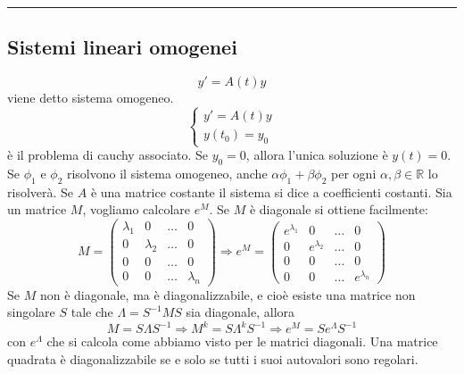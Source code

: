 \rule{\textwidth}{2pt}
\subsection*{Sistemi lineari omogenei}
\[
    y' = A(t) y
\]
viene detto sistema omogeneo.\newline
\[
    \begin{cases}
        y' = A(t) y\\
        y(t_0) = y_0
    \end{cases}
\]
è il problema di cauchy associato.\newline
\newline
Se $y_0 = 0$, allora l'unica soluzione è $y(t) = 0$.\newline
\newline
Se $\phi_1$ e $\phi_2$ risolvono il sistema omogeneo, anche $\alpha \phi_1 + \beta \phi_2$ per ogni $\alpha, \beta \in \mathbb{R}$ lo risolverà.\newline
\newline
Se $A$ è una matrice costante il sistema si dice a coefficienti costanti.\newline
\newline
Sia un matrice $M$, vogliamo calcolare $e^{M}$. \newline
Se $M$ è diagonale si ottiene facilmente:
\[
    M = \left( \begin{matrix}
        \lambda_1  & 0 &\dots & 0\\
        0 & \lambda_2 &\dots &0\\
        0 & 0 &\dots &0\\
        0 & 0 &\dots &\lambda_n
    \end{matrix} \right) \Rightarrow e^M = \left( \begin{matrix}
        e^{\lambda_1}  & 0 &\dots & 0\\
        0 & e^{\lambda_2} &\dots &0\\
        0 & 0 &\dots &0\\
        0 & 0 &\dots & e^{\lambda_n}
    \end{matrix} \right)
\]
Se $M$ non è diagonale, ma è diagonalizzabile, e cioè esiste una matrice non singolare $S$ tale che $\Lambda = S^{-1}MS$ sia diagonale, allora
\[
    M = S\Lambda S^{-1} \Rightarrow  M^k = S\Lambda^kS^{-1} \Rightarrow e^M = S e^{\Lambda}S^{-1}
\]
con $e^{\Lambda}$ che si calcola come abbiamo visto per le matrici diagonali.\newline
\newline
Una matrice quadrata è diagonalizzabile se e solo se tutti i suoi autovalori sono regolari. \newline
